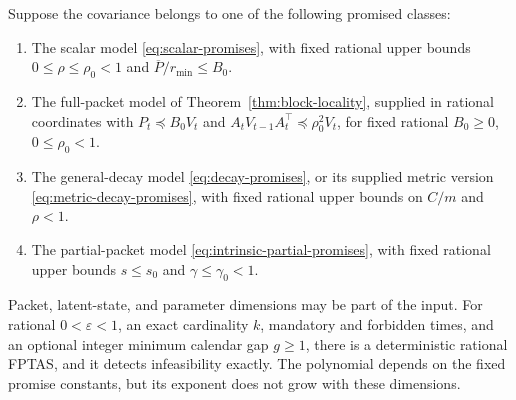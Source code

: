 \begin{theorem}
\label{thm:trace-fptas}
Suppose the covariance belongs to one of the following promised classes:
\begin{enumerate}
\item The scalar model \eqref{eq:scalar-promises}, with fixed rational upper
bounds $0\le\rho\le\rho_0<1$ and $\overline P/r_{\min}\le B_0$.
\item The full-packet model of Theorem~\ref{thm:block-locality}, supplied in
rational coordinates with
$P_t\preceq B_0V_t$ and
$A_tV_{t-1}A_t^\top\preceq\rho_0^2V_t$, for fixed rational
$B_0\ge0$, $0\le\rho_0<1$.
\item The general-decay model \eqref{eq:decay-promises}, or its supplied
metric version \eqref{eq:metric-decay-promises}, with fixed rational
upper bounds on $C/m$ and $\rho<1$.
\item The partial-packet model \eqref{eq:intrinsic-partial-promises}, with
fixed rational upper bounds $s\le s_0$ and $\gamma\le\gamma_0<1$.
\end{enumerate}
Packet, latent-state, and parameter dimensions may be part of the input.
For rational $0<\varepsilon<1$, an exact cardinality $k$, mandatory and forbidden times, and an optional
integer minimum calendar gap $g\ge1$, there is a deterministic rational
FPTAS, and it detects infeasibility exactly. The polynomial depends on the
fixed promise constants, but its exponent does not grow with these dimensions.
\end{theorem}

